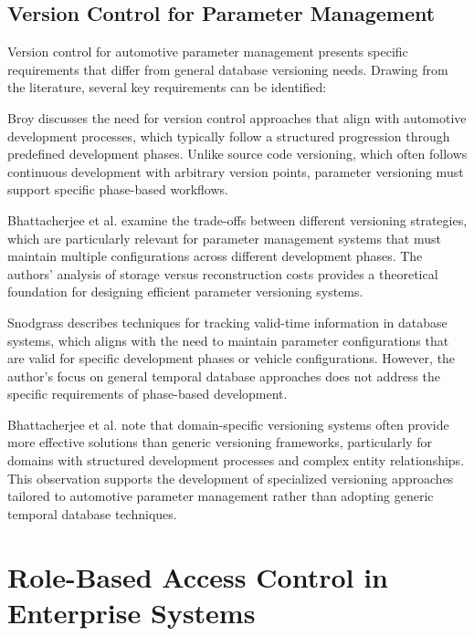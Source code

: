 \subsection{Version Control for Parameter Management}
\label{subsec:version-control-parameter-management}

Version control for automotive parameter management presents specific requirements that differ from general database versioning needs. Drawing from the literature, several key requirements can be identified:

Broy \cite{broy2006challenges} discusses the need for version control approaches that align with automotive development processes, which typically follow a structured progression through predefined development phases. Unlike source code versioning, which often follows continuous development with arbitrary version points, parameter versioning must support specific phase-based workflows.

Bhattacherjee et al. \cite{bhattacherjee2015principles} examine the trade-offs between different versioning strategies, which are particularly relevant for parameter management systems that must maintain multiple configurations across different development phases. The authors' analysis of storage versus reconstruction costs provides a theoretical foundation for designing efficient parameter versioning systems.

Snodgrass \cite{snodgrass1999developing} describes techniques for tracking valid-time information in database systems, which aligns with the need to maintain parameter configurations that are valid for specific development phases or vehicle configurations. However, the author's focus on general temporal database approaches does not address the specific requirements of phase-based development.

Bhattacherjee et al. \cite{bhattacherjee2015principles} note that domain-specific versioning systems often provide more effective solutions than generic versioning frameworks, particularly for domains with structured development processes and complex entity relationships. This observation supports the development of specialized versioning approaches tailored to automotive parameter management rather than adopting generic temporal database techniques.

\section{Role-Based Access Control in Enterprise Systems}
\label{sec:role-based-access-control}

